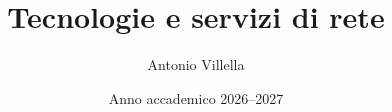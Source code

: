 \title{Tecnologie e servizi di rete}
\author{Antonio Villella}
\date{Anno accademico 2026--2027}

\maketitle
